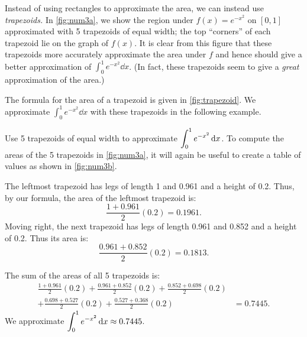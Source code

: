 Instead of using rectangles to approximate the area, we can instead use \emph{trapezoids.} In \autoref{fig:num3a}, we show the region under $f(x) = e^{-x^2}$ on $[0,1]$ approximated with 5 trapezoids of equal width; the top ``corners'' of each trapezoid lie on the graph of $f(x)$. It is clear from this figure that these trapezoids more accurately approximate the area under $f$ and hence should give a better approximation of $\int_0^1 e^{-x^2}\dd x$. (In fact, these trapezoids seem to give a \emph{great} approximation of the area.)



The formula for the area of a trapezoid is given in \autoref{fig:trapezoid}. We approximate $\int_0^1 e^{-x^2}\dd x$ with these trapezoids in the following example.

\begin{example}\label{ex_num3}%
Use 5 trapezoids of equal width to approximate $\displaystyle \int_0^1e^{-x^2}\operatorname{d}\! x$.
\solution
To compute the areas of the 5 trapezoids in \autoref{fig:num3a}, it will again be useful to create a table of values as shown in \autoref{fig:num3b}.


The leftmost trapezoid has legs of length 1 and 0.961 and a height of 0.2. Thus, by our formula, the area of the leftmost trapezoid is:
\[\frac{1+0.961}{2}(0.2) = 0.1961.\]
Moving right, the next trapezoid has legs of length 0.961 and 0.852 and a height of 0.2. Thus its area is:
\[\frac{0.961+0.852}2(0.2) = 0.1813.\]

The sum of the areas of all 5 trapezoids is:
\begin{align*}
\frac{1+0.961}{2}(0.2) + \frac{0.961+0.852}2(0.2)+\frac{0.852+0.698}2(0.2)& \\
+\frac{0.698+0.527}2(0.2)+\frac{0.527+0.368}2(0.2)&= 0.7445.
\end{align*}
We approximate $\displaystyle \int_0^1 e^{-x^2}\operatorname{d}\! x \approx 0.7445$.
\end{example}

